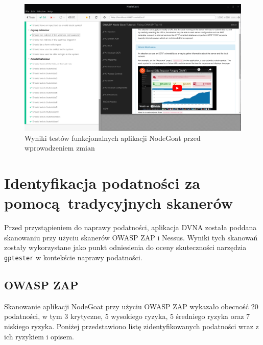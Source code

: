 \begin{figure}[H]
  \centering
  \includegraphics[width=\linewidth]{img/func-test-goat-before.png}
  \caption{Wyniki testów funkcjonalnych aplikacji NodeGoat przed wprowadzeniem zmian}
  \label{fig:nodegoat-before}
\end{figure}

\section{Identyfikacja podatności za pomocą tradycyjnych skanerów}
Przed przystąpieniem do naprawy podatności, aplikacja DVNA została poddana skanowaniu przy użyciu skanerów OWASP ZAP i Nessus. Wyniki tych skanowań zostały wykorzystane jako punkt odniesienia do oceny skuteczności narzędzia \texttt{gptester} w kontekście naprawy podatności.


\subsection{OWASP ZAP}
\label{subsec:owasp_zap}
Skanowanie aplikacji NodeGoat przy użyciu OWASP ZAP wykazało obecność 20 podatności, w tym 3 krytyczne, 5 wysokiego ryzyka, 5 średniego ryzyka oraz 7 niskiego ryzyka. Poniżej przedstawiono listę zidentyfikowanych podatności wraz z ich ryzykiem i opisem.

